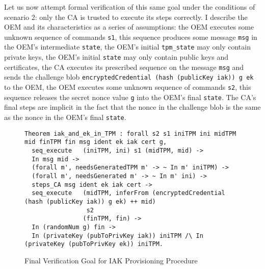\documentclass[runningheads]{llncs}
\begin{document}
Let us now attempt formal verification of this same goal under the conditions of scenario 2: only the CA is trusted to execute its steps correctly. 
I describe the OEM and its characteristics as a series of assumptions: the OEM executes some unknown sequence of commands \verb|s1|, this sequence produces some message \verb|msg| in the OEM's intermediate \verb|state|, the OEM's initial \verb|tpm_state| may only contain private keys, the OEM's initial \verb|state| may only contain public keys and certificates, the CA executes its prescribed sequence on the message \verb|msg| and sends the challenge blob \verb|encryptedCredential (hash (publicKey iak)) g ek| to the OEM, the OEM executes some unknown sequence of commands \verb|s2|, this sequence releases the secret nonce value \verb|g| into the OEM's final \verb|state|. The CA's final steps are implicit in the fact that the nonce in the challenge blob is the same as the nonce in the OEM's final \verb|state|. 

\begin{figure}[hptb]
\begin{lstlisting}[language=Coq]
Theorem iak_and_ek_in_TPM : forall s2 s1 iniTPM ini midTPM mid finTPM fin msg ident ek iak cert g,
  seq_execute   (iniTPM, ini) s1 (midTPM, mid) -> 
  In msg mid ->
  (forall m', needsGeneratedTPM m' -> ~ In m' iniTPM) ->
  (forall m', needsGenerated m' -> ~ In m' ini) ->
  steps_CA msg ident ek iak cert ->
  seq_execute   (midTPM, inferFrom (encryptedCredential (hash (publicKey iak)) g ek) ++ mid) 
                 s2 
                (finTPM, fin) ->
  In (randomNum g) fin ->
  In (privateKey (pubToPrivKey iak)) iniTPM /\ In (privateKey (pubToPrivKey ek)) iniTPM.
\end{lstlisting}
\caption{Final Verification Goal for IAK Provisioning Procedure}
\label{fig:iak_goal}
\end{figure}
\end{document}
